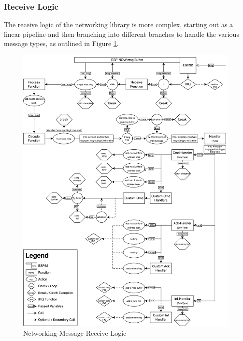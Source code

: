 \subsubsection{\label{sec:methods_recv_logic}Receive Logic}

The receive logic of the networking library is more complex, starting out as a linear pipeline and then branching into different branches to handle the various message types, as outlined in Figure \ref{fig:net_recv_logic}. 

\begin{figure}[H]
    \centering
    \includegraphics[width=\linewidth]{overleaf/images/receive_logic.drawio.png}
    \vspace{\ftspace}
    \caption{Networking Message Receive Logic}
    \label{fig:net_recv_logic}
\end{figure}


